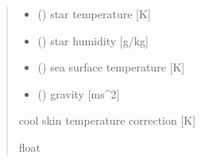 \documentclass[letterpaper,10pt,english]{sphinxmanual}
\begin{document}
\begin{fulllineitems}
\begin{quote}
\begin{description}
\begin{itemize}
\item {} 
\sphinxAtStartPar
{} () \textendash{} star temperature              {[}K{]}

\item {} 
\sphinxAtStartPar
{} () \textendash{} star humidity                 {[}g/kg{]}

\item {} 
\sphinxAtStartPar
{} () \textendash{} sea surface temperature  {[}K{]}

\item {} 
\sphinxAtStartPar
{} () \textendash{} gravity                      {[}ms\textasciicircum{}\sphinxhyphen{}2{]}

\end{itemize}

\sphinxAtStartPar
{} \textendash{} cool skin temperature correction {[}K{]}

\sphinxAtStartPar
float

\end{description}\end{quote}

\end{fulllineitems}

\end{document}
